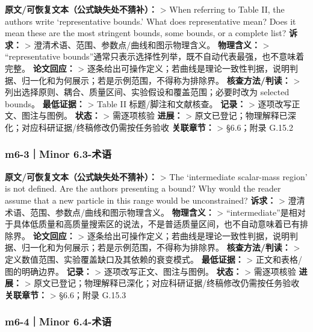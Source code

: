 \documentclass[
]{article}
\begin{document}
\textbf{原文/可恢复文本（公式缺失处不猜补）：} \textgreater{} When
referring to Table II, the authors write `representative bounds.' What
does representative mean? Does it mean these are the most stringent
bounds, some bounds, or a complete list? \textbf{诉求：} \textgreater{}
澄清术语、范围、参数点/曲线和图示物理含义。 \textbf{物理含义：}
\textgreater{} ``representative
bounds''通常只表示选择性列举，既不自动代表最强，也不意味着完整。
\textbf{论文回应：} \textgreater{}
逐条给出可操作定义；若曲线是理论一致性判据，说明判据、归一化和为何展示；若是示例范围，不得称为排除界。
\textbf{核查方法/判读：} \textgreater{}
列出选择原则、耦合、质量区间、实验假设和覆盖范围；必要时改为 selected
bounds。 \textbf{最低证据：} \textgreater{} Table II
标题/脚注和文献核查。 \textbf{记录：} \textgreater{}
逐项改写正文、图注与图例。 \textbf{状态：} \textgreater{} 需逐项核验
\textbf{进展：} \textgreater{}
原文已登记；物理解释已深化；对应科研证据/终稿修改仍需按任务验收
\textbf{关联章节：} \textgreater{} §6.6；附录 G.15.2

\subsubsection{m6-3｜Minor 6.3-术语}\label{m6-3minor-6.3-ux672fux8bed}

\textbf{原文/可恢复文本（公式缺失处不猜补）：} \textgreater{} The
`intermediate scalar-mass region' is not defined. Are the authors
presenting a bound? Why would the reader assume that a new particle in
this range would be unconstrained? \textbf{诉求：} \textgreater{}
澄清术语、范围、参数点/曲线和图示物理含义。 \textbf{物理含义：}
\textgreater{}
``intermediate''是相对于具体低质量和高质量搜索区的说法，不是普适质量区间，也不自动意味着已有排除界。
\textbf{论文回应：} \textgreater{}
逐条给出可操作定义；若曲线是理论一致性判据，说明判据、归一化和为何展示；若是示例范围，不得称为排除界。
\textbf{核查方法/判读：} \textgreater{}
定义数值范围、实验覆盖缺口及其依赖的衰变模式。 \textbf{最低证据：}
\textgreater{} 正文和表格/图的明确边界。 \textbf{记录：} \textgreater{}
逐项改写正文、图注与图例。 \textbf{状态：} \textgreater{} 需逐项核验
\textbf{进展：} \textgreater{}
原文已登记；物理解释已深化；对应科研证据/终稿修改仍需按任务验收
\textbf{关联章节：} \textgreater{} §6.6；附录 G.15.3

\subsubsection{m6-4｜Minor 6.4-术语}\label{m6-4minor-6.4-ux672fux8bed}
\end{document}
